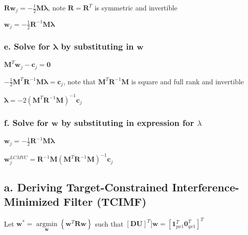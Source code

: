 \documentclass[paper=a4, fontsize=11pt]{scrartcl} %
\numberwithin{equation}{section} %
\numberwithin{figure}{section} %
\numberwithin{table}{section} %
\begin{document}
\vspace{2mm}

\(
\bm{R} \bm{w}_j = -\frac{1}{2} \bm{M} \bm{\lambda}
\), note \(\bm{R} = \bm{R}^T\) is symmetric and invertible

\vspace{2mm}

\(
\bm{w}_j = -\frac{1}{2}\bm{R}^{-1}\bm{M}\bm{\lambda}
\)

\subsubsection*{e. Solve for \(\bm{\lambda}\) by substituting in \(\bm{w}\)}

\(
\bm{M}^T\bm{w}_j - \bm{c}_j = \bm{0}
\)

\vspace{2mm}

\(
-\frac{1}{2} \bm{M}^T\bm{R}^{-1}\bm{M}\bm{\lambda} = \bm{c}_j
\), note that \(\bm{M}^T\bm{R}^{-1}\bm{M}\) is square and full rank and invertible

\vspace{2mm}

\(
\bm{\lambda}  = -2(\bm{M}^T\bm{R}^{-1}\bm{M})^{-1}\bm{c}_j
\)

\subsubsection*{f. Solve for \(\bm{w}\) by substituting in expression for \(\lambda\)}
\(
\bm{w}_j = -\frac{1}{2}\bm{R}^{-1}\bm{M}\bm{\lambda}
\)

\vspace{2mm}

\(
\bm{w}_j^{LCMVC} = \bm{R}^{-1}\bm{M}(\bm{M}^T\bm{R}^{-1}\bm{M})^{-1}\bm{c}_j
\)


\pagebreak
\subsection*{a. Deriving Target-Constrained Interference-Minimized Filter (TCIMF)}

\vspace{2mm}

Let
\hspace{5pt}
\(
\bm{w}^* =
\underset{\bm{w}}{\operatorname{argmin}}
\left\{
\bm{w}^T\bm{R}\bm{w}
\right\}
\)
\hspace{8pt} such that \hspace{8pt}
\(
\left[\bm{D}\bm{U}\right]^T]\bm{w} = \left[\bm{1}_{px1}^T \bm{0}_{qx1}^T\right]^T
\)
\end{document}
